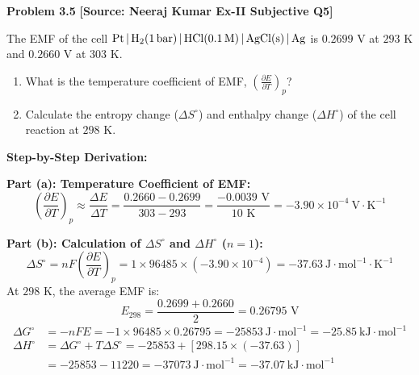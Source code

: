 \begin{problembox}
\textbf{Problem 3.5} \hfill \textbf{[Source: Neeraj Kumar Ex-II Subjective Q5]}

The EMF of the cell $\ce{Pt | H2(1 bar) | HCl(0.1 M) | AgCl(s) | Ag}$ is $0.2699\text{ V}$ at $293\text{ K}$ and $0.2660\text{ V}$ at $303\text{ K}$.
\begin{enumerate}[label=(\alph*)]
    \item What is the temperature coefficient of EMF, $\left(\frac{\partial E}{\partial T}\right)_p$?
    \item Calculate the entropy change ($\Delta S^\circ$) and enthalpy change ($\Delta H^\circ$) of the cell reaction at $298\text{ K}$.
\end{enumerate}
\end{problembox}
\begin{solution}
\textbf{Step-by-Step Derivation:}

\textbf{Part (a): Temperature Coefficient of EMF:}
\begin{equation*}
    \left(\frac{\partial E}{\partial T}\right)_p \approx \frac{\Delta E}{\Delta T} = \frac{0.2660 - 0.2699}{303 - 293} = \frac{-0.0039\text{ V}}{10\text{ K}} = -3.90 \times 10^{-4}\ \text{V}\cdot\text{K}^{-1}
\end{equation*}

\textbf{Part (b): Calculation of $\Delta S^\circ$ and $\Delta H^\circ$ ($n = 1$):}
\begin{equation*}
    \Delta S^\circ = n F \left(\frac{\partial E}{\partial T}\right)_p = 1 \times 96485 \times (-3.90 \times 10^{-4}) = -37.63\ \text{J}\cdot\text{mol}^{-1}\cdot\text{K}^{-1}
\end{equation*}
At $298\text{ K}$, the average EMF is:
\begin{equation*}
    E_{298} = \frac{0.2699 + 0.2660}{2} = 0.26795\text{ V}
\end{equation*}
\begin{align*}
    \Delta G^\circ &= -n F E = -1 \times 96485 \times 0.26795 = -25853\ \text{J}\cdot\text{mol}^{-1} = -25.85\ \text{kJ}\cdot\text{mol}^{-1} \\
    \Delta H^\circ &= \Delta G^\circ + T \Delta S^\circ = -25853 + [298.15 \times (-37.63)] \\
    &= -25853 - 11220 = -37073\ \text{J}\cdot\text{mol}^{-1} = -37.07\ \text{kJ}\cdot\text{mol}^{-1}
\end{align*}
\end{solution}

